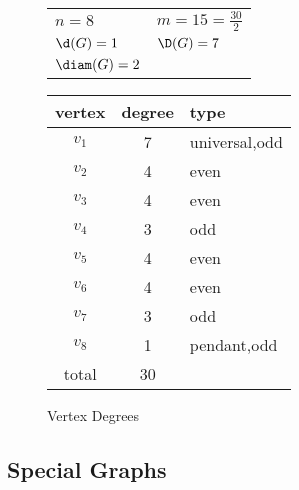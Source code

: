 \begin{figure}[H]
  \label{fig:degree}
  \begin{minipage}[t]{3in}
    \begin{center}
      \vspace{0pt}

      \bigskip

      \begin{tabular}{ll}
        \(n=8\) & \(m=15=\frac{30}{2}\) \\
        \(\d(G)=1\) & \(\D(G)=7\) \\
        \(\diam(G)=2\)
      \end{tabular}
    \end{center}
  \end{minipage}
  \begin{minipage}[t]{3in}
    \vspace{0pt}
    \begin{tabular}{c|c|l}
      vertex & degree & type \\
      \hline
      \(v_1\) & 7 & universal,odd \\
      \(v_2\) & 4 & even \\
      \(v_3\) & 4 & even \\
      \(v_4\) & 3 & odd \\
      \(v_5\) & 4 & even \\
      \(v_6\) & 4 & even \\
      \(v_7\) & 3 & odd \\
      \(v_8\) & 1 & pendant,odd \\
      \hline
      total & 30 &
    \end{tabular}
  \end{minipage}
  \caption{Vertex Degrees}
\end{figure}

\subsection{Special Graphs}\label{sec:sub:special}

